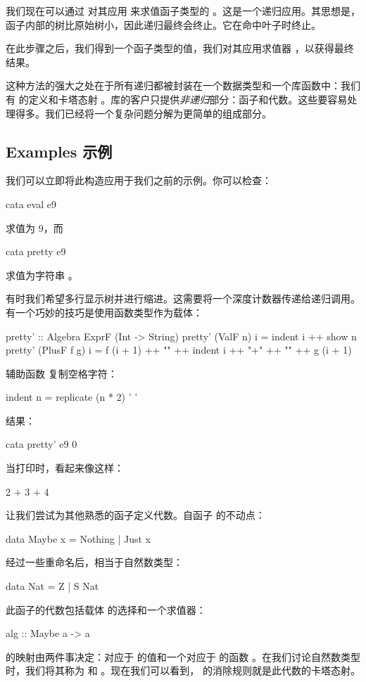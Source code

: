 \documentclass[DaoFP]{subfiles}
\begin{document}
 我们现在可以通过  对其应用  来求值函子类型的 。这是一个递归应用。其思想是，函子内部的树比原始树小，因此递归最终会终止。它在命中叶子时终止。

 在此步骤之后，我们得到一个函子类型的值，我们对其应用求值器 ，以获得最终结果。

 这种方法的强大之处在于所有递归都被封装在一个数据类型和一个库函数中：我们有  的定义和卡塔态射 。库的客户只提供\emph{非递归}部分：函子和代数。这些要容易处理得多。我们已经将一个复杂问题分解为更简单的组成部分。

 \subsection{Examples 示例}

 我们可以立即将此构造应用于我们之前的示例。你可以检查：
 \begin{haskell}
  cata eval e9
 \end{haskell}
 求值为 $9$，而
 \begin{haskell}
  cata pretty e9
 \end{haskell}
 求值为字符串 。

 有时我们希望多行显示树并进行缩进。这需要将一个深度计数器传递给递归调用。有一个巧妙的技巧是使用函数类型作为载体：
 \begin{haskell}
  pretty' :: Algebra ExprF (Int -> String)
  pretty' (ValF n) i = indent i ++ show n
  pretty' (PlusF f g) i = f (i + 1) ++ "\n" ++
  indent i ++ "+" ++ "\n" ++
  g (i + 1)
 \end{haskell}
 辅助函数  复制空格字符：
 \begin{haskell}
  indent n = replicate (n * 2) ' '
 \end{haskell}
 结果：
 \begin{haskell}
  cata pretty' e9 0
 \end{haskell}
 当打印时，看起来像这样：
 \begin{haskell}
  2
  +
  3
  +
  4
 \end{haskell}


 让我们尝试为其他熟悉的函子定义代数。自函子  的不动点：
 \begin{haskell}
  data Maybe x = Nothing | Just x
 \end{haskell}
 经过一些重命名后，相当于自然数类型：
 \begin{haskell}
  data Nat = Z | S Nat
 \end{haskell}
 此函子的代数包括载体  的选择和一个求值器：
 \begin{haskell}
  alg :: Maybe a -> a
 \end{haskell}
  的映射由两件事决定：对应于  的值和一个对应于  的函数 。在我们讨论自然数类型时，我们将其称为  和 。现在我们可以看到， 的消除规则就是此代数的卡塔态射。
\end{document}
